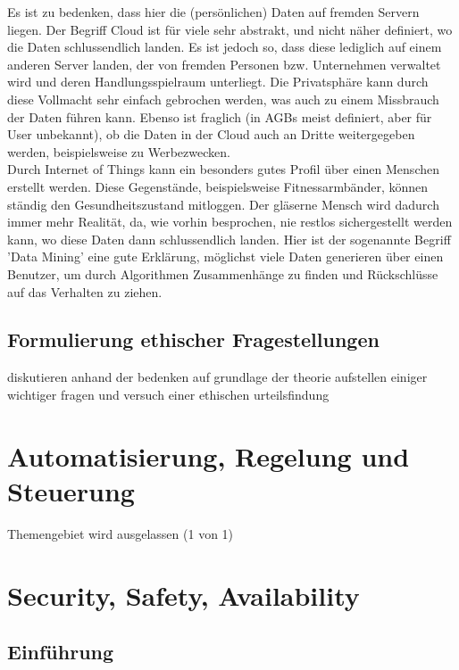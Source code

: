 \documentclass[letterpaper, 12pt]{article}
\let\tempsection\section
\renewcommand\section[1]{\vspace{-0.3cm}\tempsection{#1}\vspace{-0.3cm}}
\let\tempsubsection\subsection
\renewcommand\subsection[1]{\vspace{0cm}\tempsubsection{#1}\vspace{0cm}}
\begin{document}
Es ist zu bedenken, dass hier die (persönlichen) Daten auf fremden Servern liegen. Der Begriff Cloud ist für viele sehr abstrakt, und nicht näher definiert, wo die Daten schlussendlich landen. Es ist jedoch so, dass diese lediglich auf einem anderen Server landen, der von fremden Personen bzw. Unternehmen verwaltet wird und deren Handlungsspielraum unterliegt. Die Privatsphäre kann durch diese Vollmacht sehr einfach gebrochen werden, was auch zu einem Missbrauch der Daten führen kann. Ebenso ist fraglich (in AGBs meist definiert, aber für User unbekannt), ob die Daten in der Cloud auch an Dritte weitergegeben werden, beispielsweise zu Werbezwecken. \\
Durch Internet of Things kann ein besonders gutes Profil über einen Menschen erstellt werden. Diese Gegenstände, beispielsweise Fitnessarmbänder, können ständig den Gesundheitszustand mitloggen. Der gläserne Mensch wird dadurch immer mehr Realität, da, wie vorhin besprochen, nie restlos sichergestellt werden kann, wo diese Daten dann schlussendlich landen. Hier ist der sogenannte Begriff 'Data Mining' eine gute Erklärung, möglichst viele Daten generieren über einen Benutzer, um durch Algorithmen Zusammenhänge zu finden und Rückschlüsse auf das Verhalten zu ziehen.

\subsection{Formulierung ethischer Fragestellungen}

diskutieren anhand der bedenken auf grundlage der theorie \newline
aufstellen einiger wichtiger fragen und versuch einer ethischen urteilsfindung

\clearpage

\section{Automatisierung, Regelung und Steuerung}

Themengebiet wird ausgelassen (1 von 1)

\clearpage

\section{Security, Safety, Availability}

\subsection{Einführung}
\end{document}
